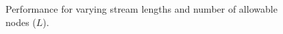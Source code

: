 \begin{figure}[t] 
	\begin{center}
		\caption{Performance for varying stream lengths and number of allowable nodes ($L$).}
		\label{fig:varying_stream_length}
	\end{center} 
\end{figure} 